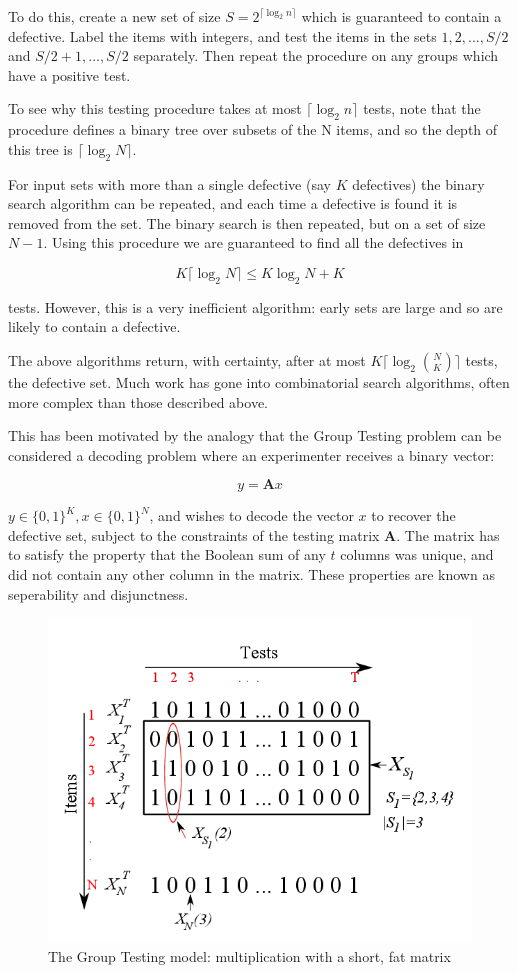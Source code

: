 \documentclass[conference]{IEEEtran}
\begin{document}
To do this, create a new set of size \(S = 2^{\lceil{\log_2{n}}\rceil}\) which is guaranteed to contain a defective. Label the items with integers, and test the items in the sets \({1,2,\ldots ,S/2}\) and \({S/2 + 1,\ldots ,S/2}\) separately. Then repeat the procedure on any groups which have a positive test. 

To see why this testing procedure takes at most \(\lceil{\log_2{n}}\rceil\) tests, note that the procedure defines a binary tree over subsets of the N items, and so the depth of this tree is \(\lceil{\log_2{N}}\rceil\).

For input sets with more than a single defective (say \(K\) defectives) the binary search algorithm can be repeated, and each time a defective is found it is removed from the set. The binary search is then repeated, but on a set of size \(N-1\). Using this procedure we are guaranteed to find all the defectives in 

\begin{equation}
K \lceil \log_2{N} \rceil \leq K\log_2{N} + K
\end{equation}

tests. However, this is a very inefficient algorithm: early sets are large and so are likely to contain a defective.

The above algorithms return, with certainty, after at most \(K\lceil \log_2{N\choose K}\rceil\) tests, the defective set. Much work has gone into combinatorial search algorithms, often more complex than those described above. 

This has been motivated by the analogy that the Group Testing problem can be considered a decoding problem where an experimenter receives a binary vector: 

\begin{equation}
y = \textbf{A}x
\end{equation}

\(y \in \{0,1\}^K, x \in \{0,1\}^N\), and wishes to decode the vector \(x\) to recover the defective set, subject to the constraints of the testing matrix \(\textbf{A}\). The matrix has to satisfy the property that the Boolean sum of any \(t\) columns was unique, and did not contain any other column in the matrix. These properties are known as seperability and disjunctness. 

\begin{figure}[h]
\centering
\includegraphics[height = 7 cm]{GTFat.png}
\caption{The Group Testing model: multiplication with a short, fat matrix \cite{Atia2008}}
\label{bayesiancs}
\end{figure}
\end{document}
